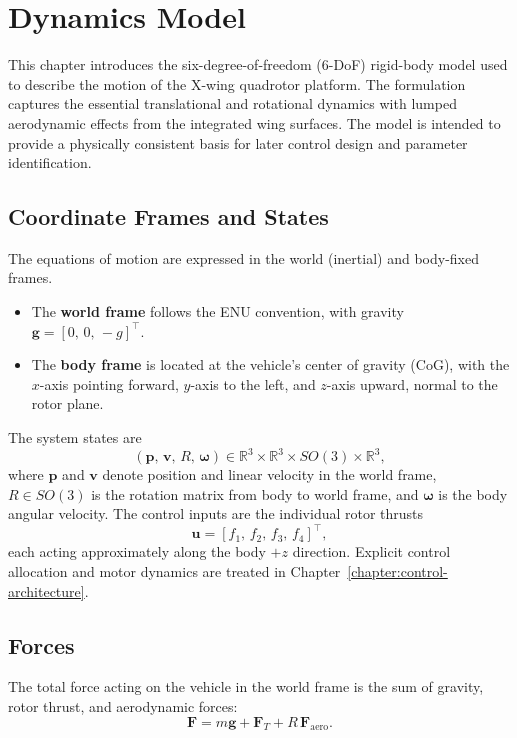 
\chapter{Dynamics Model}\label{chapter:dynamics-model}

This chapter introduces the six-degree-of-freedom (6-DoF) rigid-body model used to describe the motion of the X-wing quadrotor platform. The formulation captures the essential translational and rotational dynamics with lumped aerodynamic effects from the integrated wing surfaces. The model is intended to provide a physically consistent basis for later control design and parameter identification.

\section{Coordinate Frames and States}
The equations of motion are expressed in the world (inertial) and body-fixed frames.

\begin{itemize}
    \item The \textbf{world frame} follows the ENU convention, with gravity $\mathbf{g} = [0,\,0,\,-g]^\top$.
    \item The \textbf{body frame} is located at the vehicle's center of gravity (CoG), with the $x$-axis pointing forward, $y$-axis to the left, and $z$-axis upward, normal to the rotor plane.
\end{itemize}

The system states are
\begin{equation}
(\mathbf{p},\,\mathbf{v},\,R,\,\boldsymbol{\omega}) 
    \in \mathbb{R}^3 \times \mathbb{R}^3 \times SO(3) \times \mathbb{R}^3,
\end{equation}
where $\mathbf{p}$ and $\mathbf{v}$ denote position and linear velocity in the world frame, $R \in SO(3)$ is the rotation matrix from body to world frame, and $\boldsymbol{\omega}$ is the body angular velocity.  
The control inputs are the individual rotor thrusts
\begin{equation}
\mathbf{u} = [f_1,\,f_2,\,f_3,\,f_4]^\top,
\end{equation}
each acting approximately along the body $+z$ direction.  
Explicit control allocation and motor dynamics are treated in Chapter~\ref{chapter:control-architecture}.

\section{Forces}
The total force acting on the vehicle in the world frame is the sum of gravity, rotor thrust, and aerodynamic forces:
\begin{equation}
\mathbf{F} = m\mathbf{g} + \mathbf{F}_T + R\,\mathbf{F}_\text{aero}.
\end{equation}

